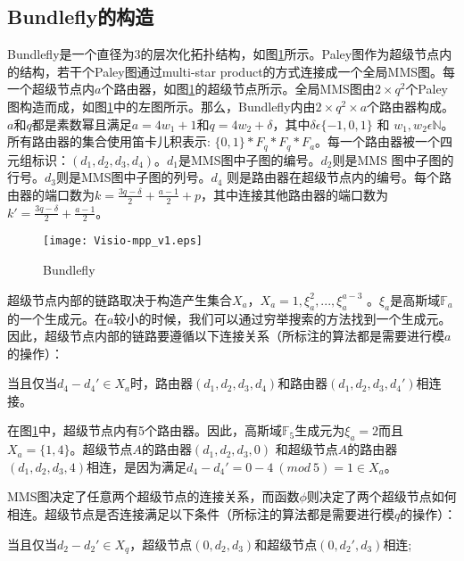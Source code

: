  \subsection{Bundlefly的构造}

 Bundlefly是一个直径为3的层次化拓扑结构，如图\ref{mppv0}所示。Paley图作为超级节点内的结构，若干个Paley图通过multi-star product的方式连接成一个全局MMS图。每一个超级节点内$a$个路由器，如图\ref{mppv0}的超级节点所示。全局MMS图由$2\times q^2$个Paley 图构造而成，如图\ref{mppv0}中的左图所示。那么，Bundlefly内由$2\times q^2\times a$个路由器构成。$a$和$q$都是素数幂且满足$a=4w_{1}+1$和$q=4w_{2}+\delta$，其中$\delta\epsilon\{-1,0,1\}$ 和 $w_{1}, w_{2}\epsilon\mathds{N}$。 所有路由器的集合使用笛卡儿积表示: $\{0,1\}*F_{q}*F_{q}*F_{a}$。每一个路由器被一个四元组标识：$(d_{1},d_{2},d_{3},d_{4})$。$d_{1}$是MMS图中子图的编号。$d_{2}$则是MMS 图中子图的行号。$d_{3}$则是MMS图中子图的列号。$d_{4}$ 则是路由器在超级节点内的编号。每个路由器的端口数为$k=\frac{3q-\delta}{2}+\frac{a-1}{2}+p$，其中连接其他路由器的端口数为$k'=\frac{3q-\delta}{2}+\frac{a-1}{2}$。

 \begin{figure}[t]
\setlength{\belowcaptionskip}{-.5cm}
  \centering
    \texttt{[image: Visio-mpp\_v1.eps]}
  \vspace{-.3cm}
  \caption{Bundlefly}
  \label{mppv0}
\end{figure}

超级节点内部的链路取决于构造产生集合$X_{a}$，$X_{a}={1,\xi_{a}^{2},...,\xi_{a}^{a-3}}$ 。$\xi_{a}$是高斯域$\mathds{F}_{a}$的一个生成元。在$a$较小的时候，我们可以通过穷举搜索的方法找到一个生成元。 因此，超级节点内部的链路要遵循以下连接关系（所标注的算法都是需要进行模$a$的操作）：

当且仅当$d_{4}-d_{4}'\in X_{a}$时，路由器$(d_{1},d_{2},d_{3},d_{4})$和路由器$(d_{1},d_{2},d_{3},d_{4}')$相连接。

在图\ref{mppv0}中，超级节点内有5个路由器。因此，高斯域$\mathds{F}_{5}$生成元为$\xi_{a}=2$而且$X_{a}=\{1,4\}$。超级节点$A$的路由器$(d_{1},d_{2},d_{3},0)$ 和超级节点$A$的路由器$(d_{1},d_{2},d_{3},4)$相连，是因为满足$d_{4}-d_{4}'= 0-4\ (mod\ 5)=1 \in X_{a}$。

MMS图决定了任意两个超级节点的连接关系，而函数$\phi$则决定了两个超级节点如何相连。超级节点是否连接满足以下条件（所标注的算法都是需要进行模$q$的操作）：

当且仅当$d_{2}-d_{2}'\in X_{q}$，超级节点$(0,d_{2},d_{3})$和超级节点$(0,d_{2}',d_{3})$相连;

